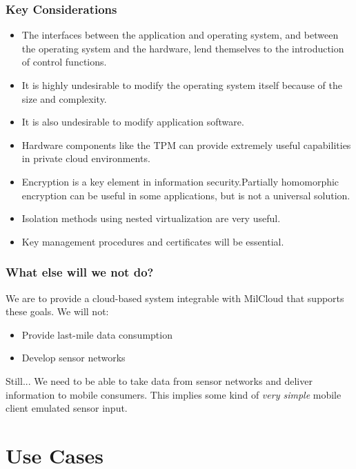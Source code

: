\documentclass[t,handout]{beamer}
\begin{document}
\begin{frame}
\frametitle{Key Considerations}
\begin{itemize}
\item The interfaces between the application and operating system, and between the operating system and the hardware, lend themselves to the introduction of control functions.
\item It is highly undesirable to modify the operating system itself because of the size and complexity.
\item It is also undesirable to modify application software.
\item Hardware components like the TPM can provide extremely useful capabilities in private cloud environments.
\item Encryption is a key element in information security.Partially homomorphic encryption can be useful in some applications, but is not a universal solution.
\item Isolation methods using nested virtualization are very useful.
\item Key management procedures and certificates will be essential.
\end{itemize}
\end{frame}

\begin{frame}
\frametitle{What else will we not do?}
We are to provide a cloud-based system integrable with MilCloud that supports these goals.  We will not:
\begin{itemize}
\item Provide last-mile data consumption
\item Develop sensor networks
\end{itemize}
\begin{beamerboxesrounded}[shadow]{Still...}
{\small We need to be able to take data from sensor networks and deliver information to mobile consumers. This implies some kind of {\sl very simple} mobile client emulated sensor input.}
\end{beamerboxesrounded}
\end{frame}

\section{Use Cases}
\end{document}
